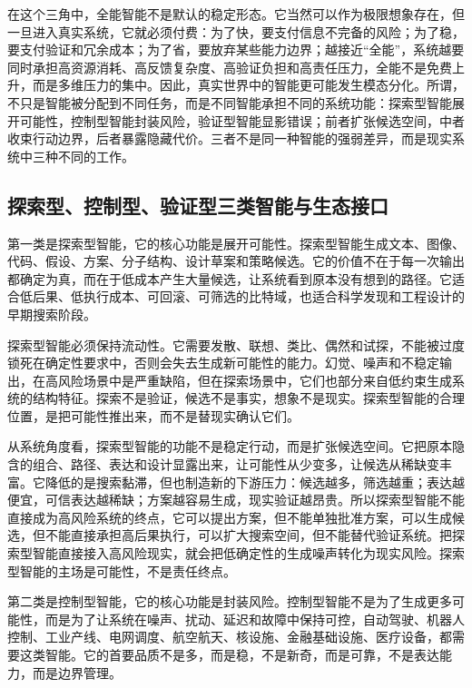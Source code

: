在这个三角中，全能智能不是默认的稳定形态。它当然可以作为极限想象存在，但一旦进入真实系统，它就必须付费：为了快，要支付信息不完备的风险；为了稳，要支付验证和冗余成本；为了省，要放弃某些能力边界；越接近“全能”，系统越要同时承担高资源消耗、高反馈复杂度、高验证负担和高责任压力，全能不是免费上升，而是多维压力的集中。因此，真实世界中的智能更可能发生模态分化。所谓，不只是智能被分配到不同任务，而是不同智能承担不同的系统功能：探索型智能展开可能性，控制型智能封装风险，验证型智能显影错误；前者扩张候选空间，中者收束行动边界，后者暴露隐藏代价。三者不是同一种智能的强弱差异，而是现实系统中三种不同的工作。

\subsection{探索型、控制型、验证型三类智能与生态接口}


第一类是探索型智能，它的核心功能是展开可能性。探索型智能生成文本、图像、代码、假设、方案、分子结构、设计草案和策略候选。它的价值不在于每一次输出都确定为真，而在于低成本产生大量候选，让系统看到原本没有想到的路径。它适合低后果、低执行成本、可回滚、可筛选的比特域，也适合科学发现和工程设计的早期搜索阶段。

探索型智能必须保持流动性。它需要发散、联想、类比、偶然和试探，不能被过度锁死在确定性要求中，否则会失去生成新可能性的能力。幻觉、噪声和不稳定输出，在高风险场景中是严重缺陷，但在探索场景中，它们也部分来自低约束生成系统的结构特征。探索不是验证，候选不是事实，想象不是现实。探索型智能的合理位置，是把可能性推出来，而不是替现实确认它们。

从系统角度看，探索型智能的功能不是稳定行动，而是扩张候选空间。它把原本隐含的组合、路径、表达和设计显露出来，让可能性从少变多，让候选从稀缺变丰富。它降低的是搜索黏滞，但也制造新的下游压力：候选越多，筛选越重；表达越便宜，可信表达越稀缺；方案越容易生成，现实验证越昂贵。所以探索型智能不能直接成为高风险系统的终点，它可以提出方案，但不能单独批准方案，可以生成候选，但不能直接承担高后果执行，可以扩大搜索空间，但不能替代验证系统。把探索型智能直接接入高风险现实，就会把低确定性的生成噪声转化为现实风险。探索型智能的主场是可能性，不是责任终点。


第二类是控制型智能，它的核心功能是封装风险。控制型智能不是为了生成更多可能性，而是为了让系统在噪声、扰动、延迟和故障中保持可控，自动驾驶、机器人控制、工业产线、电网调度、航空航天、核设施、金融基础设施、医疗设备，都需要这类智能。它的首要品质不是多，而是稳，不是新奇，而是可靠，不是表达能力，而是边界管理。

